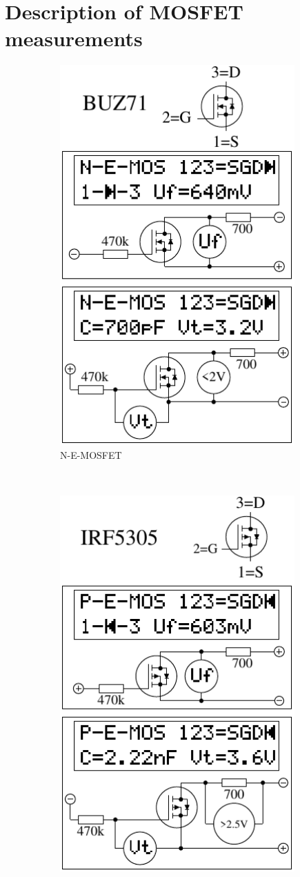 \chapter{Description of  MOSFET measurements}
\label{sec:MOSmeasurements}

\begin{figure}[H]
  \begin{subfigure}[b]{9cm}
    \centering
    \includegraphics[width=9cm]{../FIG/MOS_BUZ71.pdf}
    \caption{N-E-MOSFET}
    \label{fig:MOS-N-E}
  \end{subfigure}
  ~
  \begin{subfigure}[b]{9cm}
    \centering
    \includegraphics[width=9cm]{../FIG/MOS_IRF5305.pdf}

\end{subfigure}
\end{figure}
